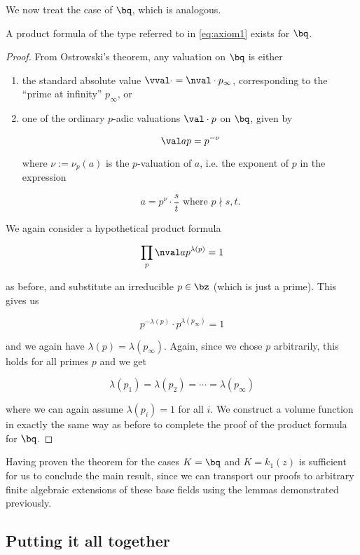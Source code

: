 We now treat the case of $\bq$, which is analogous.

\begin{thm}
  A product formula of the type referred to in \ref{eq:axiom1} exists for $\bq$.
\end{thm}

\begin{proof}
  From Ostrowski's theorem, any valuation on $\bq$ is either

  \begin{enumerate}
  \item the standard absolute value $\vval\cdot = \nval\cdot {p_\infty}$,
    corresponding to the ``prime at infinity'' $p_\infty$, or
  \item one of the ordinary $p$-adic valuations $\val\cdot p$ on $\bq$, given by

    \[ \val a p = p^{-\nu} \]

    where $\nu := \nu_p(a)$ is the $p$-valuation of $a$, i.e. the exponent of $p$ in
    the expression

    \[ a = p^\nu \cdot \frac st \text{ where } p\nmid s, t. \]
  \end{enumerate}

  We again consider a hypothetical product formula

  \[ \prod_p \nval a p^{\lambda(p)} = 1 \]

  as before, and substitute an irreducible $p \in\bz$ (which is just a prime).
  This gives us

  \[ p^{-\lambda(p)} \cdot p^{\lambda(p_\infty)} = 1 \]

  and we again have $\lambda(p) = \lambda(p_\infty)$. Again, since we chose $p$
  arbitrarily, this holds for all primes $p$ and we get

  \[ \lambda(p_1) = \lambda(p_2) = \cdots = \lambda(p_\infty) \]

  where we can again assume $\lambda(p_i) = 1$ for all $i$. We construct a
  volume function in exactly the same way as before to complete the proof of the
  product formula for $\bq$.

\end{proof}

Having proven the theorem for the cases $K=\bq$ and $K=k_1(z)$ is sufficient for
us to conclude the main result, since we can transport our proofs to arbitrary
finite algebraic extensions of these base fields using the lemmas demonstrated
previously.

\subsection{Putting it all together}

